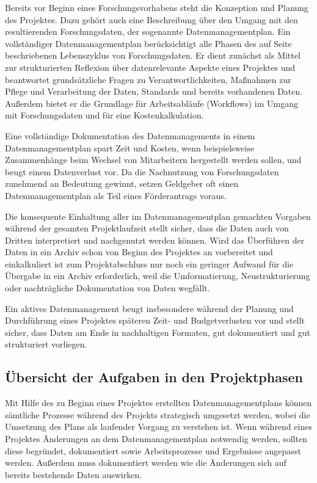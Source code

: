 Bereits vor Beginn eines Forschungsvorhabens steht die Konzeption und Planung des Projektes. Dazu gehört auch eine Beschreibung über den Umgang mit den resultierenden Forschungsdaten, der sogenannte Datenmanagementplan. Ein vollständiger Datenmanagementplan berücksichtigt alle Phasen des auf Seite \pageref{lebenszyklus} beschriebenen Lebenszyklus von Forschungsdaten. Er dient zunächst als Mittel zur strukturierten Reflexion über datenrelevante Aspekte eines Projektes und beantwortet grundsätzliche Fragen zu Verantwortlichkeiten, Maßnahmen zur Pflege und Verarbeitung der Daten, Standards und bereits vorhandenen Daten. Außerdem bietet er die Grundlage für Arbeitsabläufe (Workflows) im Umgang mit Forschungsdaten und für eine Kostenkalkulation.

Eine vollständige Dokumentation des Datenmanagements in einem Datenmanagementplan spart Zeit und Kosten, wenn beispielsweise Zusammenhänge beim Wechsel von Mitarbeitern hergestellt werden sollen, und beugt einem Datenverlust vor. Da die Nachnutzung von Forschungsdaten zunehmend an Bedeutung gewinnt, setzen Geldgeber oft einen Datenmanagementplan als Teil eines Förderantrags voraus.

Die konsequente Einhaltung aller im Datenmanagementplan gemachten Vorgaben während der gesamten Projektlaufzeit stellt sicher, dass die Daten auch von Dritten interpretiert und nachgenutzt werden können. Wird das Überführen der Daten in ein Archiv schon von Beginn des Projektes an vorbereitet und einkalkuliert ist zum Projektabschluss nur noch ein geringer Aufwand für die Übergabe in ein Archiv erforderlich, weil die Umformatierung, Neustrukturierung oder nachträgliche Dokumentation von Daten wegfällt.

Ein aktives Datenmanagement beugt insbesondere während der Planung und Durchführung eines Projektes späteren Zeit- und Budgetverlusten vor und stellt sicher, dass Daten am Ende in nachhaltigen Formaten, gut dokumentiert und gut strukturiert vorliegen.

\subsection{Übersicht der Aufgaben in den Projektphasen}
Mit Hilfe des zu Beginn eines Projektes erstellten Datenmanagementplans können sämtliche Prozesse während des Projekts strategisch umgesetzt werden, wobei die Umsetzung des Plans als laufender Vorgang zu verstehen ist. Wenn während eines Projektes Änderungen an dem Datenmanagementplan notwendig werden, sollten diese begründet, dokumentiert sowie Arbeitsprozesse und Ergebnisse angepasst werden. Außerdem muss dokumentiert werden wie die Änderungen sich auf bereits bestehende Daten auswirken.

